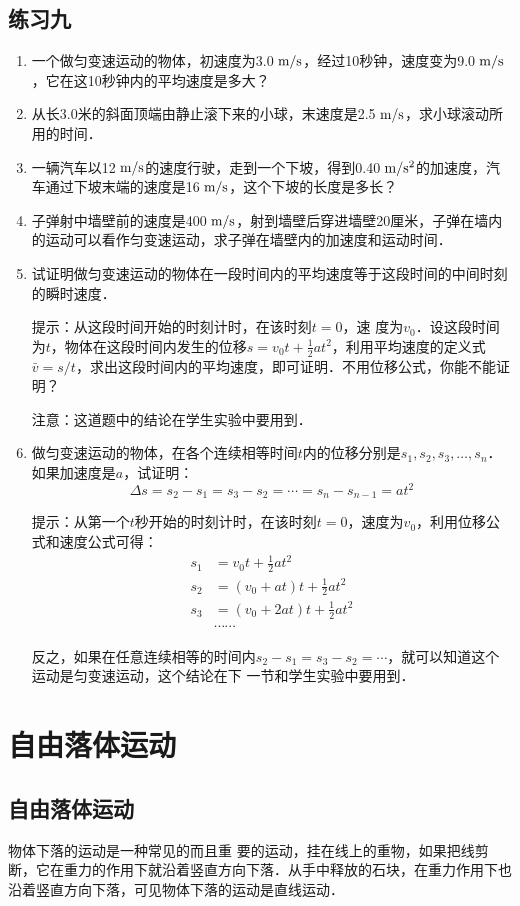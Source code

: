 \subsection*{练习九}
\begin{enumerate}
\item 一个做匀变速运动的物体，初速度为3.0$\;\text{m}/\text{s}$，经过10秒钟，速度变为9.0$\;\text{m}/\text{s}$，它在这10秒钟内的平均速度是多大？
\item 从长3.0米的斜面顶端由静止滚下来的小球，末速度是2.5$\;\text{m}/\text{s}$，求小球滚动所用的时间．
\item 一辆汽车以12$\;\text{m}/\text{s}$的速度行驶，走到一个下坡，得到0.40$\;\text{m}/\text{s}^2$的加速度，汽车通过下坡末端的速度是16$\;\text{m}/\text{s}$，这个下坡的长度是多长？
\item 子弹射中墙壁前的速度是400$\;\text{m}/\text{s}$，射到墙壁后穿进墙壁20厘米，子弹在墙内的运动可以看作匀变速运动，求子弹在墙壁内的加速度和运动时间．
\item 试证明做匀变速运动的物体在一段时间内的平均速度等于这段时间的中间时刻的瞬时速度．

提示：从这段时间开始的时刻计时，在该时刻$t=0$，速
度为$v_0$．设这段时间为$t$，物体在这段时间内发生的位移$s=v_0t +\frac{1}{2}at^2$，利用平均速度的定义式$\bar v=s/t$，求出这段时间内的平均速度，即可证明．不用位移公式，你能不能证明？

注意：这道题中的结论在学生实验中要用到．

\item 做匀变速运动的物体，在各个连续相等时间$t$内的位移分别是$s_1, s_2, s_3,\ldots,s_n$．如果加速度是$a$，试证明：
\[\Delta s=s_2-s_1=s_3-s_2=\cdots=s_n-s_{n-1}=at^2 \]

提示：从第一个$t$秒开始的时刻计时，在该时刻$t=0$，速度为$v_0$，利用位移公式和速度公式可得：
\[\begin{split}
s_1&=v_0t +\frac{1}{2}at^2\\
s_2&=(v_0+at)t +\frac{1}{2}at^2\\
s_3&=(v_0+2at)t +\frac{1}{2}at^2\\
&\cdots\cdots
\end{split} \]

反之，如果在任意连续相等的时间内$s_2-s_1=s_3-s_2=\cdots$，就可以知道这个运动是匀变速运动，这个结论在下
一节和学生实验中要用到．
\end{enumerate}

\section{自由落体运动}
\subsection{自由落体运动}
物体下落的运动是一种常见的而且重
要的运动，挂在线上的重物，如果把线剪断，它在重力的作用下就沿着竖直方向下落．从手中释放的石块，在重力作用下也沿着竖直方向下落，可见物体下落的运动是直线运动．

